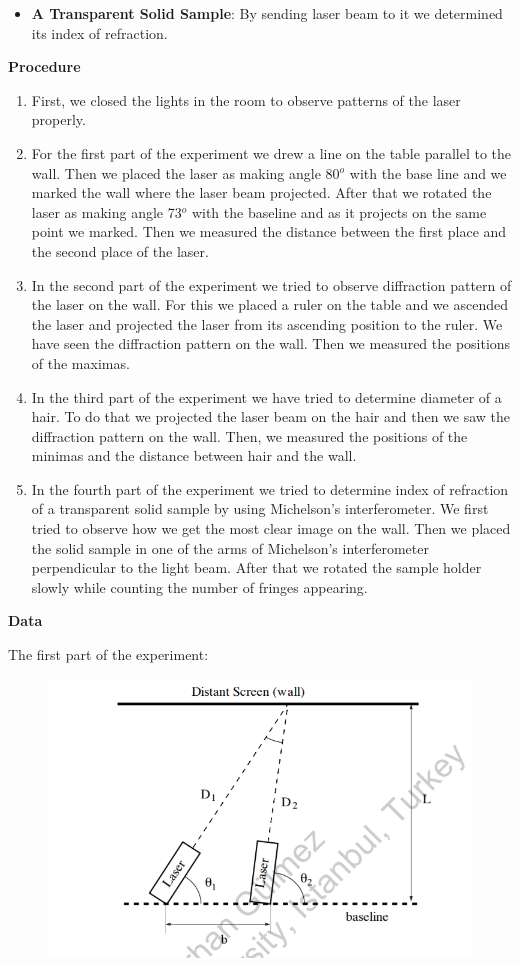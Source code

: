 \documentclass[11pt,a4paper]{article}
\begin{document}
{\begin{itemize}
	\item \textbf{A Transparent Solid Sample}: By sending laser beam to it we determined its index of refraction.
\end{itemize}
\textbf{\small{Procedure}}
\begin{enumerate}
	\item First, we closed the lights in the room to observe patterns of the laser properly.
	\item For the first part of the experiment we drew a line on the table parallel to the wall. Then we placed the laser as making angle 80$^o$ with the base line and we marked the wall where the laser beam projected. After that we rotated the laser as making angle 73$^o$ with the baseline and as it projects on the same point we marked. Then we measured the distance between the first place and the second place of the laser.
	\item In the second part of the experiment we tried to observe diffraction pattern of the laser on the wall. For this we placed a ruler on the table and we ascended the laser and projected the laser from its ascending position to the ruler. We have seen the diffraction pattern on the wall. Then we measured the positions of the maximas.
	\item In the third part of the experiment we have tried to determine diameter of a hair. To do that we projected the laser beam on the hair and then we saw the diffraction pattern on the wall. Then, we measured the positions of the minimas and the distance between hair and the wall.
	\item In the fourth part of the experiment we tried to determine index of refraction of a transparent solid sample by using Michelson's interferometer. We first tried to observe how we get the most clear image on the wall. Then we placed the solid sample in one of the arms of Michelson's interferometer perpendicular to the light beam. After that we rotated the sample holder slowly while counting the number of fringes appearing.
\end{enumerate}
\textbf{\small{Data}}\\[\baselineskip]
\par The first part of the experiment:
\begin{figure}[H]
	\begin{center}
		\includegraphics[scale=0.7]{t.png}

\end{center}
\end{figure}}
\end{document}
